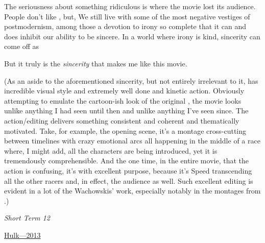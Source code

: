 \documentclass[../butidigress.tex]{subfiles}
\begin{document}
The seriousness about something ridiculous is where the movie lost its audience.
People don't like , but, \autocite{hulkspeedracer2015}
We still live with some of the most negative vestiges of postmodernism, among those a devotion to irony so complete that it can and does inhibit our ability to be sincere.
In a world where irony is kind, sincerity can come off as 

But it truly is the \emph{sincerity} that makes me like this movie.

\entryskip

(As an aside to the aforementioned sincerity, but not entirely irrelevant to it,  has incredible visual style and extremely well done and kinetic action.
Obviously attempting to emulate the cartoon-ish look of the original , the movie looks unlike anything I had seen until then and unlike anything I've seen since.
The action/editing delivers something consistent and coherent and thematically motivated.
Take, for example, the opening scene, it's a montage cross-cutting between timelines with crazy emotional arcs all happening in the middle of a race where, I might add, all the characters are being introduced, yet it is tremendously comprehensible.
And the one time, in the entire movie, that the action is confusing, it's with excellent purpose, because it's Speed transcending all the other racers and, in effect, the audience as well.
Such excellent editing is evident in a lot of the Wachowskis' work, especially notably in the montages from .)



\begin{somenotes}{\textit{Short Term 12}}
    \item \href{https://birthmoviesdeath.com/2013/03/16/sxsw-review-why-short-term-12-is-a-masterpiece}{Hulk---2013}\autocite{hulkshortterm2015}
\end{somenotes}
\end{document}
